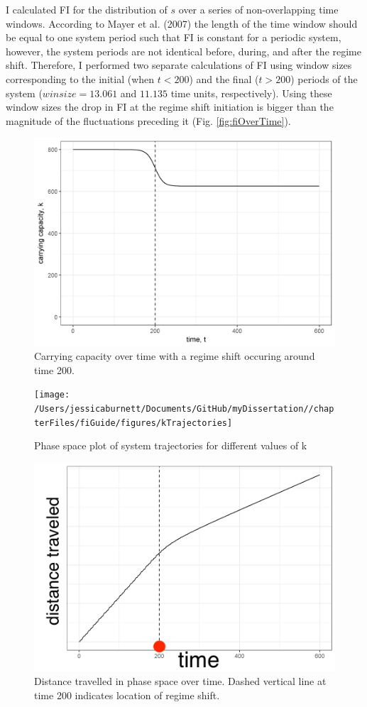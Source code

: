 \documentclass[12pt,twoside,openany]{reedthesis}
\begin{document}
I calculated FI for the distribution of \(s\) over a series of non-overlapping time windows. According to Mayer et al. (2007) the length of the time window should be equal to one system period such that FI is constant for a periodic system, however, the system periods are not identical before, during, and after the regime shift. Therefore, I performed two separate calculations of FI using window sizes corresponding to the initial (when \(t<200\)) and the final (\(t>200\)) periods of the system (\(winsize = 13.061\) and \(11.135\) time units, respectively). Using these window sizes the drop in FI at the regime shift initiation is bigger than the magnitude of the fluctuations preceding it (Fig. \ref{fig:fiOverTime}).
\begin{figure}
\includegraphics[width=0.95\linewidth]{./chapterFiles/fiGuide/figures/kByTime} \caption{Carrying capacity over time with a regime shift occuring around time 200.}\label{fig:kByTime}
\end{figure}
\begin{figure}
\texttt{[image: /Users/jessicaburnett/Documents/GitHub/myDissertation//chapterFiles/fiGuide/figures/kTrajectories]} \caption{Phase space plot of system trajectories for different values of k}\label{fig:kTrajectories}
\end{figure}
\begin{figure}
\includegraphics[width=0.95\linewidth]{./chapterFiles/fiGuide/figures/sOverTime} \caption{Distance travelled in phase space over time. Dashed vertical line at time 200 indicates location of regime shift.}\label{fig:sOverTime}
\end{figure}
\end{document}
